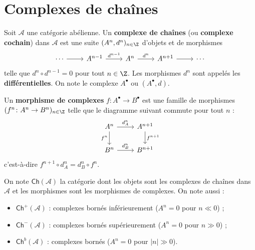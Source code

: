 
\section{Complexes de chaînes}\label{sec:chain-complexes}

\begin{definition}\label{def:chain-complex}
Soit $\mathcal{A}$ une catégorie abélienne. Un \textbf{complexe de chaînes}
(ou \textbf{complexe cochain}) dans $\mathcal{A}$ est une suite
$(A^n, d^n)_{n \in \Z}$ d'objets et de morphismes
\[
\begin{tikzcd}
\cdots \arrow[r] & A^{n-1} \arrow[r, "d^{n-1}"] & A^n \arrow[r, "d^n"]
  & A^{n+1} \arrow[r] & \cdots
\end{tikzcd}
\]
telle que $d^{n} \circ d^{n-1} = 0$ pour tout $n \in \Z$.
Les morphismes $d^n$ sont appelés les \textbf{différentielles}.
On note le complexe $A^\bullet$ ou $(A^\bullet, d)$.
\end{definition}

\begin{definition}\label{def:chain-map}
Un \textbf{morphisme de complexes} $f \colon A^\bullet \to B^\bullet$
est une famille de morphismes $(f^n \colon A^n \to B^n)_{n \in \Z}$
telle que le diagramme suivant commute pour tout $n$ :
\[
\begin{tikzcd}
A^n \arrow[r, "d_A^n"] \arrow[d, "f^n"'] & A^{n+1} \arrow[d, "f^{n+1}"] \\
B^n \arrow[r, "d_B^n"] & B^{n+1}
\end{tikzcd}
\]
c'est-à-dire $f^{n+1} \circ d_A^n = d_B^n \circ f^n$.
\end{definition}

\begin{notation}\label{not:Ch}
On note $\mathsf{Ch}(\mathcal{A})$ la catégorie dont les objets sont les
complexes de chaînes dans $\mathcal{A}$ et les morphismes sont les
morphismes de complexes. On note aussi :
\begin{itemize}
\item $\mathsf{Ch}^+(\mathcal{A})$ :
  complexes bornés inférieurement ($A^n = 0$ pour $n \ll 0$) ;
\item $\mathsf{Ch}^-(\mathcal{A})$ :
  complexes bornés supérieurement ($A^n = 0$ pour $n \gg 0$) ;
\item $\mathsf{Ch}^b(\mathcal{A})$ :
  complexes bornés ($A^n = 0$ pour $|n| \gg 0$).
\end{itemize}
\end{notation}

